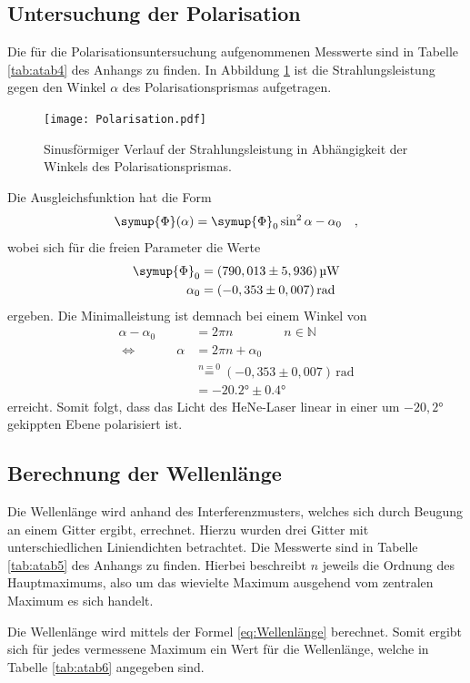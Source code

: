 \subsection{Untersuchung der Polarisation}
Die für die Polarisationsuntersuchung aufgenommenen Messwerte sind in Tabelle \ref{tab:atab4} des Anhangs zu finden. 
In Abbildung \ref{fig:afig4} ist die Strahlungsleistung gegen den Winkel $\alpha$ des Polarisationsprismas aufgetragen.
\noindent
\FloatBarrier
\begin{figure}[h]
\centering
\texttt{[image: Polarisation.pdf]}
\caption{Sinusförmiger Verlauf der Strahlungsleistung in Abhängigkeit der Winkels des Polarisationsprismas.}
\label{fig:afig4}
\end{figure}
\FloatBarrier
Die Ausgleichsfunktion hat die Form
\begin{equation}
\symup{\Phi}(\alpha) = \symup{\Phi}_0 \sin^2{\alpha-\alpha_0} \quad ,
\end{equation}
wobei sich für die freien Parameter die Werte
\begin{align}
\symup{\Phi}_0 & = (790,013\pm 5,936)\, \si{\micro\watt}\\
\alpha_0 &= (-0,353\pm 0,007)\, \mathrm{rad}
\end{align}
ergeben. 
Die Minimalleistung ist demnach bei einem Winkel von
\begin{align}
\alpha - \alpha_0 &= 2\pi n \qquad \qquad n \in \mathbb{N} \\
\Leftrightarrow \qquad \quad \alpha &=  2\pi n + \alpha_0 \\
&\stackrel{n = 0}{=} (-0,353\pm 0,007)\, \mathrm{rad} \\
&= -20.2° \pm 0.4°
\end{align}
erreicht. Somit folgt, dass das Licht des HeNe-Laser linear in einer um $-20,2°$ gekippten Ebene polarisiert ist.

\subsection{Berechnung der Wellenlänge}
Die Wellenlänge wird anhand des Interferenzmusters, welches sich durch Beugung an einem Gitter ergibt, errechnet.
Hierzu wurden drei Gitter mit unterschiedlichen Liniendichten betrachtet.
Die Messwerte sind in Tabelle \ref{tab:atab5} des Anhangs zu finden. 
Hierbei beschreibt $n$ jeweils die Ordnung des Hauptmaximums, also um das wievielte Maximum ausgehend vom zentralen Maximum es sich handelt.

Die Wellenlänge wird mittels der Formel \eqref{eq:Wellenlänge} berechnet.
Somit ergibt sich für jedes vermessene Maximum ein Wert für die Wellenlänge, welche in Tabelle \ref{tab:atab6} angegeben sind.

